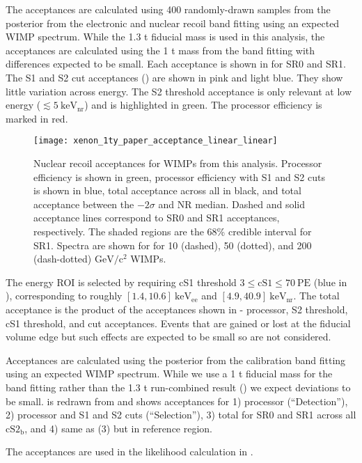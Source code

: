 The acceptances are calculated using 400 randomly-drawn samples from the posterior from the electronic and nuclear recoil band
fitting using an expected WIMP spectrum.  While the 1.3 t fiducial mass is used in this analysis, the
acceptances are calculated using the 1 t mass from the band fitting with differences expected to be small.  Each acceptance is shown in
 for SR0 and SR1.  The S1 and S2 cut
acceptances () are shown in pink and light blue.  They show little variation
across energy.  The S2 threshold acceptance
is only relevant at low energy ($\lesssim 5\ \mathrm{keV_{nr}}$) and is highlighted in green.  The processor efficiency is marked in
red.

\begin{figure}
\centering
\texttt{[image: xenon\_1ty\_paper\_acceptance\_linear\_linear]}
\caption{Nuclear recoil acceptances for WIMPs from this analysis.  Processor efficiency is shown in green, processor efficiency with S1
and S2 cuts is shown in blue, total acceptance across all \cstwob in black, and total acceptance between the $-2\sigma$ and NR
median.  Dashed and solid acceptance lines correspond to SR0 and SR1 acceptances,
respectively.  The shaded regions are the 68\% credible interval for SR1.  Spectra are shown for for 10 (dashed), 50 (dotted), and
200 (dash-dotted) $\mathrm{GeV/c^2}$ WIMPs.}
\label{fig:dark_matter_results_acceptances_band_fitting}
\end{figure}

The energy ROI is selected by requiring cS1 threshold $3 \leq \mathrm{cS1} \leq 70\ \mathrm{PE}$ (blue in
), corresponding to roughly
$[1.4, 10.6]\ \mathrm{keV_{ee}}$ and $[4.9, 40.9]\ \mathrm{keV_{nr}}$.  The total acceptance is the product of the acceptances shown
in  - processor, S2 threshold, cS1 threshold, and
cut acceptances.  Events that are gained or lost at the fiducial volume edge but such effects are
expected to be small so are not considered.

Acceptances are calculated using the posterior from the calibration band fitting using an expected
WIMP spectrum.  While we use a 1 t fiducial mass for the band fitting rather than the 1.3 t run-combined
result () we expect deviations to be
small.   is redrawn from  and
shows acceptances for 1) processor (``Detection''), 2) processor and S1
and S2 cuts (``Selection''), 3) total for SR0 and SR1 across all $\mathrm{cS2_b}$, and 4) same as (3) but in reference region.

The acceptances are used in the likelihood calculation in .